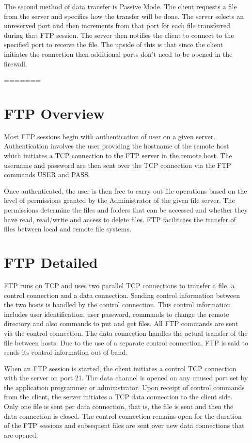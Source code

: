 The second method of data transfer is Passive Mode. The client requests a file from the server and specifies how the transfer will be done. The server selects an unreserved port
and then increments from that port for each file transferred during that FTP session. The server then notifies the client to connect to the specified port to receive the file. The
upside of this is that since the client initiates the connection then additional ports don't need to be opened in the firewall. \newpage



=======
\section{FTP Overview}
Most FTP sessions begin with authentication of user on a given server. Authentication involves the user providing the hostname of the remote host which initiates a TCP
connection to the FTP server in the remote host. The username and password are then sent over the TCP connection via the FTP commands USER and PASS. \par Once authenticated, the user
is then free to carry out file operations based on the level of permissions granted by the Administrator of the given file server. The permissions determine the files and folders
that can be accessed and whether they have read, read/write and access to delete files. FTP facilitates the transfer of files between local and remote file systems.

\section{FTP Detailed}
FTP runs on TCP and uses two parallel TCP connections to transfer a file, a control connection and a data connection. Sending control information between the two hosts is handled by the control connection.
This control information includes user identification, user password, commands to change the remote directory and also commands to put and get files. All FTP commands are sent via the control
connection. The data connection handles the actual transfer of the file between hosts. Due to the use of a separate control connection, FTP is said to sends its control information out of band.\par
When an FTP session is started, the client initiates a control TCP connection with the server on port 21. The data channel is opened on any unused port set by the application programmer or administrator.
Upon receipt of control commands from the client, the server initiates a TCP data connection to the client side. Only one file is sent per data connection, that is, the file is sent and then the data connection is closed.
The control connection remains open for the duration of the FTP sessions and subsequent files are sent over new data connections that are opened.

